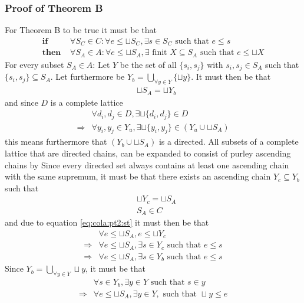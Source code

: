 \subsubsection{Proof of Theorem B}
For Theorem B to be true it must be that
\begin{align}
	\textbf{if }		& \forall S_C \in C: \forall e \leq \sqcup S_C,																	\label{eq:cola:pt2:st}
										\exists s \in S_C \text{ such that } e \leq s \\
	\textbf{then }	& \forall S_A \in A: \forall e \leq \sqcup S_A,
										\exists \text{ finit } X \subseteq S_A \text{ such that } e \leq \sqcup X			\label{eq:cola:pt2:en}
\end{align}
For every subset $S_A \in A$: Let $Y$ be the set of all $\{s_i,s_j\}$ with $s_i,s_j \in S_A$ such that $ \{s_i,s_j\} \subseteq S_A$. Let furthermore be $Y_b = \bigcup_{\forall y \in Y} \{\sqcup y\}$. It must then be that
\begin{align}
						& \sqcup S_A = \sqcup Y_b
\end{align}
and since $D$ is a complete lattice
\begin{align}
						& \forall d_i,d_j \in D, \exists \sqcup \{d_i,d_j\} \in D \\
\Rightarrow	&	\forall y_i,y_j \in Y_u, \exists \sqcup \{y_i,y_j\} \in (Y_u \cup \sqcup S_A)
\end{align}
this means furthermore that $(Y_b \cup \sqcup S_A)$ is a directed. All subsets of a complete lattice that are directed chains, can be expanded to consist of purley ascending chains by
Since every directed set always contains at least one ascending chain with the same supremum, it must be that there exists an ascending chain $Y_c \subseteq Y_b$ such that
\begin{align}
						& \sqcup Y_c = \sqcup S_A \\
						& S_A \in C
\end{align}
and due to equation \ref{eq:cola:pt2:st} it must then be that 
\begin{align}
						& \forall e \leq \sqcup S_A, e \leq \sqcup Y_c \\
\Rightarrow & \forall e \leq \sqcup S_A, \exists s \in Y_c \text{ such that } e \leq s \\
\Rightarrow & \forall e \leq \sqcup S_A, \exists s \in Y_b \text{ such that } e \leq s
\end{align}
Since $Y_b = \bigcup_{\forall y \in Y} \sqcup y$, it must be that
\begin{align}
						& \forall s \in Y_b, \exists y \in Y \text{ such that } s \in y \\
\Rightarrow	&	\forall e \leq \sqcup S_A, \exists y \in Y, \text{ such that } \sqcup y \leq e
\end{align}
